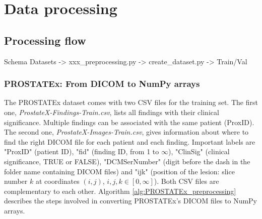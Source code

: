 
\chapter{Data processing}
\label{ch:data_processing}




\section{Processing flow}

Schema Datasets -> xxx\_preprocessing.py -> create\_dataset.py -> Train/Val


\subsection{PROSTATEx: From DICOM to NumPy arrays}

The PROSTATEx dataset comes with two CSV files for the training set. The first one, \textit{ProstateX-Findings-Train.csv}, lists all findings with their clinical significance. Multiple findings can be associated with the same patient (ProxID). The second one, \textit{ProstateX-Images-Train.csv}, gives information about where to find the right DICOM file for each patient and each finding. Important labels are "ProxID" (patient ID), "fid" (finding ID, from 1 to $\infty$), "ClinSig" (clinical significance, TRUE or FALSE), "DCMSerNumber" (digit before the dash in the folder name containing DICOM files) and "ijk" (position of the lesion: slice number $k$ at coordinates $(i,j)$, $i,j,k \in [0,\infty]$). Both CSV files are complementary to each other. Algorithm \ref{alg:PROSTATEx_preprocessing} describes the steps involved in converting PROSTATEx's DICOM files to NumPy arrays. 

